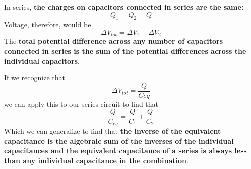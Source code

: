 In series, \textbf{the charges on capacitors connected in series are the same:}
\begin{equation}
  \label{eq:eqcapcharser}
  Q_1 = Q_2 = Q
\end{equation}
Voltage, therefore, would be
\begin{equation}
  \label{eq:eqcapvoltser}
  \Delta V_{tot}=\Delta V_1 + \Delta V_2
\end{equation}
The \textbf{total potential difference across any number of capacitors connected
in series is the sum of the potential differences across the individual
capacitors}.\cite[p.~729]{serway}
\begin{figure}[h]
  \begin{center}
    \end{center}
  \label{ckt:sercap}
\end{figure}
If we recognize that \[\Delta V_{tot}=\frac{Q}{C{eq}} \] we can apply this to
our series circuit to find that
\[\frac{Q}{C_{eq}}=\frac{Q}{C_1}+ \frac{Q}{C_2}\]
Which we can generalize to find that \textbf{the inverse of the equivalent
capacitance is the algebraic sum of the inverses of the individual capacitances
and the equivalent capacitance of a series is always less than any individual
capacitance in the combination}.\cite[p.~730]{serway}

